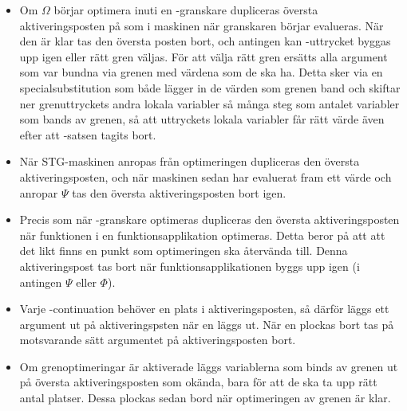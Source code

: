 \documentclass[../Optimise]{subfiles}
\begin{document}
\begin{itemize}
\item
Om $\Omega$ börjar optimera inuti en -granskare dupliceras översta aktiveringsposten 
på som i maskinen när granskaren börjar evalueras. När den är klar
tas den översta posten bort, och antingen kan -uttrycket byggas upp igen
eller rätt gren väljas. För att välja rätt gren ersätts alla argument som var
bundna via grenen med värdena som de ska ha. Detta sker via en specialsubstitution 
som både lägger in de värden som grenen band och skiftar ner grenuttryckets andra lokala 
variabler så många steg som antalet variabler som bands av grenen, så att uttryckets
lokala variabler får rätt värde även efter att -satsen tagits bort.

\item
När STG-maskinen anropas från optimeringen dupliceras den översta aktiveringsposten,
och när maskinen sedan har evaluerat fram ett värde och anropar $\Psi$ tas den översta aktiveringsposten bort igen.

\item
Precis som när -granskare optimeras dupliceras den översta aktiveringsposten när
funktionen i en funktionsapplikation optimeras. Detta beror på att att det likt 
finns en punkt som optimeringen ska återvända till. Denna aktiveringspost tas bort när 
funktionsapplikationen byggs upp igen (i antingen $\Psi$ eller $\Phi$). 

\item
Varje -continuation behöver en plats i aktiveringsposten, så därför
läggs ett argument ut på aktiveringspsten när en  läggs ut.
När en  plockas bort tas på motsvarande sätt argumentet på aktiveringsposten bort.

\item
Om grenoptimeringar är aktiverade läggs variablerna som binds av grenen ut på
översta aktiveringsposten som okända, bara för att de ska ta upp rätt antal platser.
Dessa plockas sedan bord när optimeringen av grenen är klar. 


\end{itemize}
\end{document}

